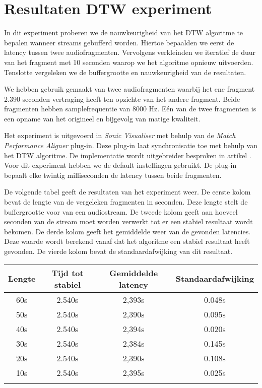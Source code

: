 \chapter{Resultaten DTW experiment}
\label{appendix-a}

In dit experiment proberen we de nauwkeurigheid van het DTW algoritme te bepalen wanneer streams gebufferd worden. Hiertoe bepaalden we eerst de latency tussen twee audiofragmenten. Vervolgens verkleinden we iteratief de duur van het fragment met 10 seconden waarop we het algoritme opnieuw uitvoerden. Tenslotte vergeleken we de buffergrootte en nauwkeurigheid van de resultaten.

We hebben gebruik gemaakt van twee audiofragmenten waarbij het ene fragment 2.390 seconden vertraging heeft ten opzichte van het andere fragment. Beide fragmenten hebben samplefrequentie van 8000 Hz. Eén van de twee fragmenten is een opname van het origineel en bijgevolg van matige kwaliteit.

Het experiment is uitgevoerd in \textit{Sonic Visualiser} met behulp van de \textit{Match Performance Aligner} plug-in. Deze plug-in laat synchronisatie toe met behulp van het DTW algoritme. De implementatie wordt uitgebreider besproken in artikel \cite{dixon2005match}. Voor dit experiment hebben we de default instellingen gebruikt. De plug-in bepaalt elke twintig milliseconden de latency tussen beide fragmenten.

De volgende tabel geeft de resultaten van het experiment weer. De eerste kolom bevat de lengte van de vergeleken fragmenten in seconden. Deze lengte stelt de buffergrootte voor van een audiostream. De tweede kolom geeft aan hoeveel seconden van de stream moet worden verwerkt tot er een stabiel resultaat wordt bekomen. De derde kolom geeft het gemiddelde weer van de gevonden latencies. Deze waarde wordt berekend vanaf dat het algoritme een stabiel resultaat heeft gevonden. De vierde kolom bevat de standaardafwijking van dit resultaat.\\

\begin{center}
\begin{tabular}{ c  c  c  c }
	\hline
	\textbf{Lengte} & \textbf{Tijd tot stabiel} & \textbf{Gemiddelde latency} & \textbf{Standaardafwijking} \\
	\hline
	60s & 2.540s & 2,393s & 0.048s \\
	50s & 2.540s & 2,390s & 0.095s \\
	40s & 2.540s & 2,394s & 0.020s \\
	30s & 2.540s & 2,384s & 0.145s \\
	20s & 2.540s & 2,390s & 0.108s \\
	10s & 2.540s & 2,395s & 0.025s \\
	\\
\end{tabular}\\
\end{center}

